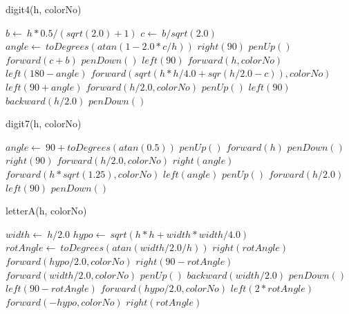 \documentclass[a4paper,10pt]{article}
\begin{document}
\begin{algorithm}
\caption{digit4(h, colorNo)}
\begin{algorithmic}[5]

\STATE {}
\STATE {}
  \STATE \(b\gets\ h*0.5/(sqrt(2.0)+1)\)
  \STATE \(c\gets\ b/sqrt(2.0)\)
  \STATE \(angle\gets\ toDegrees(atan(1-2.0*c/h))\)
  \STATE \(right(90)\)
  \STATE \(penUp()\)
  \STATE \(forward(c+b)\)
  \STATE \(penDown()\)
  \STATE \(left(90)\)
  \STATE \(forward(h,colorNo)\)
  \STATE \(left(180-angle)\)
  \STATE \(forward(sqrt(h*h/4.0+sqr(h/2.0-c)),colorNo)\)
  \STATE \(left(90+angle)\)
  \STATE \(forward(h/2.0,colorNo)\)
  \STATE \(penUp()\)
  \STATE \(left(90)\)
  \STATE \(backward(h/2.0)\)
  \STATE \(penDown()\)

\end{algorithmic}
\end{algorithm}


\begin{algorithm}
\caption{digit7(h, colorNo)}
\begin{algorithmic}[5]

\STATE {}
\STATE {}
  \STATE \(angle\gets\ 90+toDegrees(atan(0.5))\)
  \STATE \(penUp()\)
  \STATE \(forward(h)\)
  \STATE \(penDown()\)
  \STATE \(right(90)\)
  \STATE \(forward(h/2.0,colorNo)\)
  \STATE \(right(angle)\)
  \STATE \(forward(h*sqrt(1.25),colorNo)\)
  \STATE \(left(angle)\)
  \STATE \(penUp()\)
  \STATE \(forward(h/2.0)\)
  \STATE \(left(90)\)
  \STATE \(penDown()\)

\end{algorithmic}
\end{algorithm}


\begin{algorithm}
\caption{letterA(h, colorNo)}
\begin{algorithmic}[5]

\STATE {}
\STATE {}
  \STATE \(width\gets\ h/2.0\)
  \STATE \(hypo\gets\ sqrt(h*h+width*width/4.0)\)
  \STATE \(rotAngle\gets\ toDegrees(atan(width/2.0/h))\)
  \STATE \(right(rotAngle)\)
  \STATE \(forward(hypo/2.0,colorNo)\)
  \STATE \(right(90-rotAngle)\)
  \STATE \(forward(width/2.0,colorNo)\)
  \STATE \(penUp()\)
  \STATE \(backward(width/2.0)\)
  \STATE \(penDown()\)
  \STATE \(left(90-rotAngle)\)
  \STATE \(forward(hypo/2.0,colorNo)\)
  \STATE \(left(2*rotAngle)\)
  \STATE \(forward(-hypo,colorNo)\)
  \STATE \(right(rotAngle)\)

\end{algorithmic}
\end{algorithm}
\end{document}
